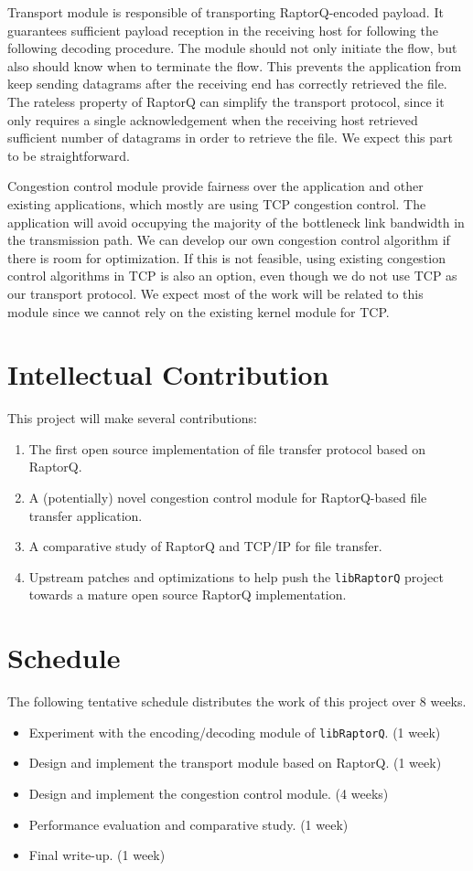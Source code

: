 \documentclass{sig-alternate-10pt}
\begin{document}
Transport module is responsible of transporting RaptorQ-encoded payload. It
guarantees sufficient payload reception in the receiving host for following the
following decoding procedure. The module should not only initiate the flow, but
also should know when to terminate the flow. This prevents the application from
keep sending datagrams after the receiving end has correctly retrieved the file.
The rateless property of RaptorQ can simplify the transport protocol, since it
only requires a single acknowledgement when the receiving host retrieved
sufficient number of datagrams in order to retrieve the file. We expect this
part to be straightforward.

Congestion control module provide fairness over the application and other
existing applications, which mostly are using TCP congestion control. The
application will avoid occupying the majority of the bottleneck link bandwidth in
the transmission path. We can develop our own congestion control algorithm if
there is room for optimization. If this is not feasible, using existing
congestion control algorithms in TCP is also an option, even though we do not
use TCP as our transport protocol. We expect most of the work will be related to
this module since we cannot rely on the existing kernel module for TCP.

\section{Intellectual Contribution}

This project will make several contributions:
\begin{enumerate}
  \item The first open source implementation of file transfer protocol based on
  RaptorQ.
  \item A (potentially) novel congestion control module for RaptorQ-based file
  transfer application.
  \item A comparative study of RaptorQ and TCP/IP for file transfer.
  \item Upstream patches and optimizations to help push the \texttt{libRaptorQ}
  project towards a mature open source RaptorQ implementation.
\end{enumerate}

\section{Schedule}

The following tentative schedule distributes the work of this project over 8 weeks.
\begin{itemize}
  \item Experiment with the encoding/decoding module of \texttt{libRaptorQ}. (1 week)
  \item Design and implement the transport module based on RaptorQ. (1 week)
  \item Design and implement the congestion control module. (4 weeks)
  \item Performance evaluation and comparative study. (1 week)
  \item Final write-up. (1 week)
\end{itemize}



\end{document}
